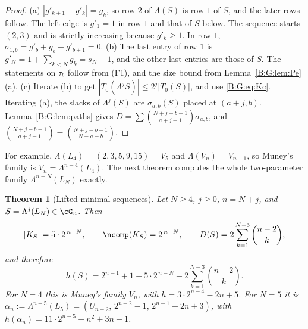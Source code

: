 \documentclass[11pt,a4paper]{article}
\newtheorem{theorem}{Theorem}[section]
\theoremstyle{definition}
\theoremstyle{remark}
\numberwithin{equation}{section}
\begin{document}
\begin{proof}
(a) $|g'_{k+1}-g'_k|=g_k$, so row $2$ of $\Lambda(S)$ is row $1$ of $S$, and the later rows
follow. The left edge is $g'_1=1$ in row $1$ and that of $S$ below. The sequence starts $(2,3)$
and is strictly increasing because $g'_k\ge1$. In row $1$,
$\sigma_{1,b}=g'_b+g_b-g'_{b+1}=0$. (b) The last entry of row $1$ is
$g'_N=1+\sum_{k<N}g_k=s_N-1$, and the other last entries are those of $S$. The statements on
$\tau_b$ follow from (F1), and the size bound from Lemma~\ref{B:G:lem:Pe}(a). (c) Iterate (b) to get
$|T_0(\Lambda^jS)|\le2^j|T_0(S)|$, and use \eqref{B:G:eq:Kc}. Iterating (a), the slacks of
$\Lambda^j(S)$ are $\sigma_{a,b}(S)$ placed at $(a+j,b)$. Lemma~\ref{B:G:lem:paths} gives
$D=\sum\binom{N+j-b-1}{a+j-1}\sigma_{a,b}$, and $\binom{N+j-b-1}{a+j-1}=\binom{N+j-b-1}{N-a-b}$.
\end{proof}

For example, $\Lambda(L_4)=(2,3,5,9,15)=V_5$ and $\Lambda(V_n)=V_{n+1}$, so Muney's family is
$V_n=\Lambda^{n-4}(L_4)$. The next theorem computes the whole two-parameter family
$\Lambda^{n-N}(L_N)$ exactly.

\begin{theorem}[Lifted minimal sequences]\label{B:G:thm:lift}
Let $N\ge4$, $j\ge0$, $n=N+j$, and $S=\Lambda^j(L_N)\in\cG_n$. Then
\[
 |K_S|=5\cdot2^{\,n-N},\qquad \ncomp(K_S)=2^{\,n-N},\qquad
 D(S)=2\sum_{k=1}^{N-3}\binom{n-2}{k},
\]
and therefore
\[
 h(S)=2^{n-1}+1-5\cdot2^{\,n-N}-2\sum_{k=1}^{N-3}\binom{n-2}{k}.
\]
For $N=4$ this is Muney's family $V_n$, with $h=3\cdot2^{n-4}-2n+5$. For $N=5$ it is
$\alpha_n:=\Lambda^{n-5}(L_5)=(U_{n-2},\,2^{n-2}-1,\,2^{n-1}-2n+3)$, with
$h(\alpha_n)=11\cdot2^{n-5}-n^2+3n-1$.
\end{theorem}
\end{document}
